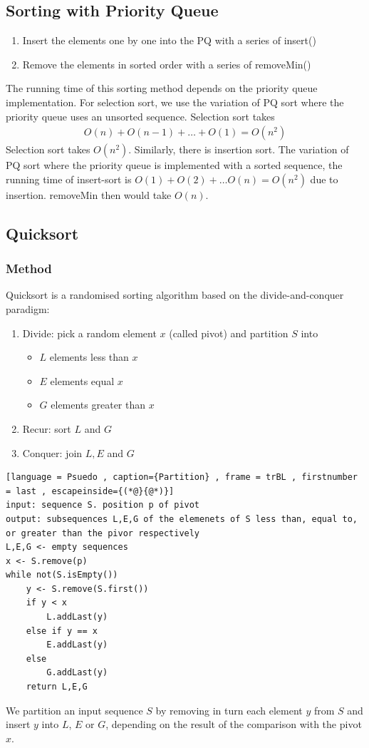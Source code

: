 \documentclass[a4paper]{article}
\theoremstyle{plain}
\theoremstyle{definition}
\theoremstyle{remark}
\begin{document}
\subsection{Sorting with Priority Queue}
\begin{enumerate}
	\item Insert the elements one by one into the PQ with a series of insert()
	\item Remove the elements in sorted order with a series of removeMin()
\end{enumerate}
The running time of this sorting method depends on the priority queue implementation. For selection sort, we use the variation of PQ sort where the priority queue uses an unsorted sequence. Selection sort takes
\begin{align*}
	O(n) + O(n-1) + \ldots + O(1) = O(n^2)
\end{align*}
Selection sort takes $O(n^2)$. Similarly, there is insertion sort. The variation of PQ sort where the priority queue is implemented with a sorted sequence, the running time of insert-sort is
$O(1)+O(2) + \ldots O(n) = O(n^2)$ due to insertion. removeMin then would take $O(n)$.
\subsection{Quicksort}
\subsubsection{Method}
Quicksort is a randomised sorting algorithm based on the divide-and-conquer paradigm:
\begin{enumerate}
	\item Divide: pick a random element $x$ (called pivot) and partition $S$ into
		\begin{itemize}
			\item $L$ elements less than $x$ 
			\item $E$ elements equal $x$ 
			\item $G$ elements greater than $x$
		\end{itemize}
	\item Recur: sort $L$ and $G$ 
	\item Conquer: join $L,E$ and $G$
\end{enumerate}
\begin{lstlisting}[language = Psuedo , caption={Partition} , frame = trBL , firstnumber = last , escapeinside={(*@}{@*)}]
input: sequence S. position p of pivot
output: subsequences L,E,G of the elemenets of S less than, equal to, or greater than the pivor respectively
L,E,G <- empty sequences
x <- S.remove(p)
while not(S.isEmpty())
	y <- S.remove(S.first())
	if y < x
		L.addLast(y)
	else if y == x
		E.addLast(y)
	else
		G.addLast(y)
	return L,E,G
\end{lstlisting}
We partition an input sequence $S$ by removing in turn each element $y$ from $S$ and insert $y$ into $L$, $E$ or $G$, depending on the result of the comparison with the pivot $x$.
\end{document}

